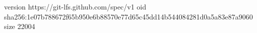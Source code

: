 version https://git-lfs.github.com/spec/v1
oid sha256:1e07b788672f65b950e6b88570e77d65c45dd14b544084281d0a5a83e87a9060
size 22004
